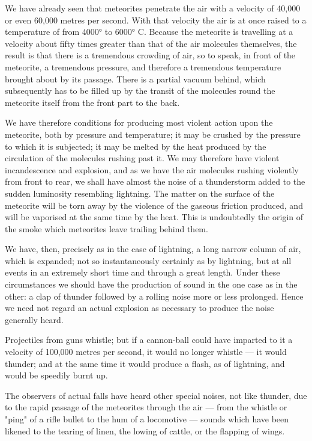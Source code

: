 \documentclass[a4paper, 12pt, oneside, polutonikogreek, english]{article}
\begin{document}
We have already seen that meteorites penetrate the air with a velocity of 40,000 or even 60,000 metres per second. With that velocity the air is at once raised to a temperature of from 4000° to 6000° C. Because the meteorite is travelling at a velocity about fifty times greater than that of the air molecules themselves, the result is that there is a tremendous crowding of air, so to speak, in front of the meteorite, a tremendous pressure, and therefore a tremendous temperature brought about by its passage. There is a partial vacuum behind, which subsequently has to be filled up by the transit of the molecules round the meteorite itself from the front part to the back.

We have therefore conditions for producing most violent action upon the meteorite, both by pressure and temperature; it may be crushed by the pressure to which it is subjected; it may be melted by the heat produced by the circulation of the molecules rushing past it. We may therefore have violent incandescence and explosion, and as we have the air molecules rushing violently from front to rear, we shall have almost the noise of a thunderstorm added to the sudden luminosity resembling lightning. The matter on the surface of the meteorite will be torn away by the violence of the gaseous friction produced, and will be vaporised at the same time by the heat. This is undoubtedly the origin of the smoke which meteorites leave trailing behind them.

We have, then, precisely as in the case of lightning, a long narrow column of air, which is expanded; not so instantaneously certainly as by lightning, but at all events in an extremely short time and through a great length. Under these circumstances we should have the production of sound in the one case as in the other: a clap of thunder followed by a rolling noise more or less prolonged. Hence we need not regard an actual explosion as necessary to produce the noise generally heard.

Projectiles from guns whistle; but if a cannon-ball could have imparted to it a velocity of 100,000 metres per second, it would no longer whistle --- it would thunder; and at the same time it would produce a flash, as of lightning, and would be speedily burnt up.

The observers of actual falls have heard other special noises, not like thunder, due to the rapid passage of the meteorites through the air --- from the whistle or "ping" of a rifle bullet to the hum of a locomotive --- sounds which have been likened to the tearing of linen, the lowing of cattle, or the flapping of wings.
\end{document}
